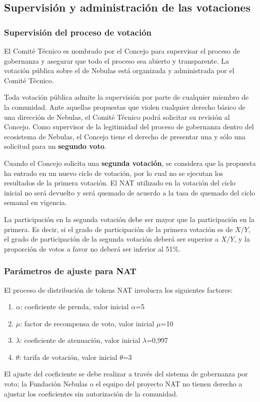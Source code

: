 \subsection{Supervisión y administración de las votaciones}

\subsubsection{Supervisión del proceso de votación}
\label{second-vote}

El Comité Técnico es nombrado por el Concejo para supervisar el proceso de gobernanza y asegurar que todo el proceso sea abierto y transparente. La votación pública sobre el \blockchain de Nebulas está organizada y administrada por el Comité Técnico.

Toda votación pública admite la supervisión por parte de cualquier miembro de la comunidad. Ante aquellas propuestas que violen cualquier derecho básico de una dirección de Nebulas, el Comité Técnico podrá solicitar su revisión al Concejo. Como supervisor de la legitimidad del proceso de gobernanza dentro del ecosistema de Nebulas, el Concejo tiene el derecho de presentar una y sólo una solicitud para un \textbf{segundo voto}.

Cuando el Concejo solicita una \textbf{segunda votación}, se considera que la propuesta ha entrado en un nuevo ciclo de votación, por lo cual no se ejecutan los resultados de la primera votación. El NAT utilizado en la votación del ciclo inicial no será devuelto y será quemado de acuerdo a la tasa de quemado del ciclo semanal en vigencia.

La participación en la segunda votación debe ser mayor que la participación en la primera. Es decir, si el grado de participación de la primera votación es de $X/Y$, el grado de participación de la segunda votación deberá ser superior a $X/Y$, y la proporción de votos a favor no deberá ser inferior al 51\%.

\subsubsection{Parámetros de ajuste para NAT}

El proceso de distribución de tokens NAT involucra los siguientes factores:

\begin{enumerate}
	\item $\alpha$: coeficiente de prenda, valor inicial $\alpha$=5
	\item $\mu$: factor de recompensa de voto, valor inicial $\mu$=10
	\item $\lambda$: coeficiente de atenuación, valor inicial $\lambda$=0,997
	\item $\theta$: tarifa de votación, valor inicial $\theta$=3
\end{enumerate}

El ajuste del coeficiente se debe realizar a través del sistema de gobernanza por voto; la Fundación Nebulas o el equipo del proyecto NAT no tienen derecho a ajustar los coeficientes sin autorización de la comunidad.